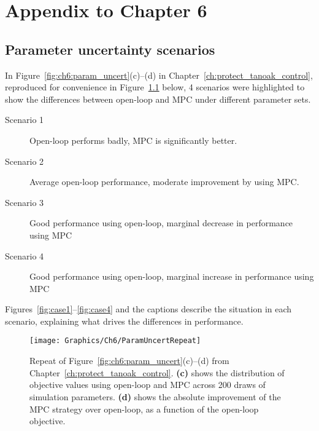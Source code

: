 \chapter{Appendix to Chapter 6\label{app:mixed_stand}}

\section{Parameter uncertainty scenarios\label{app:mixed_stand_1}}


In Figure~\ref{fig:ch6:param_uncert}(c)--(d) in Chapter~\ref{ch:protect_tanoak_control}, reproduced for convenience in Figure~\ref{fig:param_uncert_repeat} below, 4 scenarios were highlighted to show the differences between open-loop and MPC under different parameter sets.
\begin{description}
    \item[Scenario 1] Open-loop performs badly, MPC is significantly better.
    \item[Scenario 2] Average open-loop performance, moderate improvement by using MPC.
    \item[Scenario 3] Good performance using open-loop, marginal decrease in performance using MPC
    \item[Scenario 4] Good performance using open-loop, marginal increase in performance using MPC
\end{description}
Figures~\ref{fig:case1}--\ref{fig:case4} and the captions describe the situation in each scenario, explaining what drives the differences in performance.

\begin{figure}[H]
    \begin{center}
        \texttt{[image: Graphics/Ch6/ParamUncertRepeat]}
        \caption[Repeat of Figure~\ref{fig:ch6:param_uncert}(c)--(d) for reference]{Repeat of Figure~\ref{fig:ch6:param_uncert}(c)--(d) from Chapter~\ref{ch:protect_tanoak_control}. \textbf{(c)} shows the distribution of objective values using open-loop and MPC across 200 draws of simulation parameters. \textbf{(d)} shows the absolute improvement of the MPC strategy over open-loop, as a function of the open-loop objective.\label{fig:param_uncert_repeat}}
    \end{center}
\end{figure}

